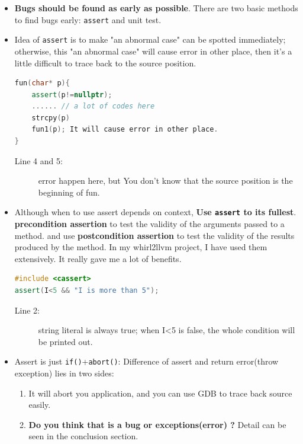 \documentclass[a4paper,11pt,twoside]{book}
\begin{document}
\begin{itemize}
	\item \textbf{Bugs should be found as early as possible}. There are two basic methods to find bugs early: \texttt{assert} and unit test.
	
	\item Idea of \texttt{assert} is to make "an abnormal case" can be spotted immediately; otherwise, this "an abnormal case" will cause error in other place, then it's a little difficult to trace back to the source position.
\begin{lstlisting}[frame=single, language=c++]
fun(char* p){
	assert(p!=nullptr);
	...... // a lot of codes here
	strcpy(p) 
	fun1(p); It will cause error in other place.
}
\end{lstlisting}
\begin{description}
	\item[Line 4 and 5:] error happen here, but You don't know that the source position is the beginning of fun.
\end{description}
	
	\item Although when to use assert depends on context, \textbf{Use \texttt{assert} to its fullest}. \textbf{precondition assertion} to test the validity of the arguments passed to a method. and use \textbf{postcondition assertion} to test the validity of the results produced by the method.  In my whirl2llvm project, I have used them extensively. It really gave me a lot of benefits.

\begin{lstlisting}[frame=single, language=c++]
#include <cassert>
assert(I<5 && "I is more than 5");
\end{lstlisting}
\begin{description}
	\item[Line 2:] string literal is always true; when I<5 is false, the whole condition will be printed out.
\end{description}
	
	\item Assert is just \texttt{if()}+\texttt{abort()}: Difference of assert and return error(throw exception)  lies in two sides: 
	\begin{enumerate}
		\item It will abort you application, and you can use GDB to trace back source easily.
		\item \textbf{Do you think that is a bug or  exceptions(error) ?} Detail can be seen in the conclusion section.
	\end{enumerate}
	

\end{itemize}
\end{document}
